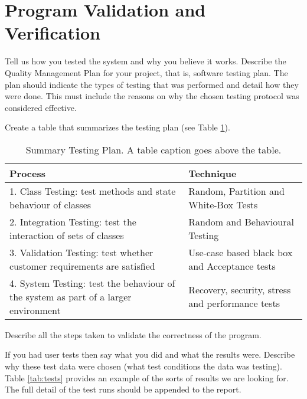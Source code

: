 \section{Program Validation and Verification}
\label{ss:progr-valid-verif}

Tell us how you tested the system and why you believe it works.
Describe the Quality Management Plan for your project, that is,
software testing plan. The plan should indicate the types of testing
that was performed and detail how they were done. This must include
the reasons on why the chosen testing protocol was considered
effective.

Create a table that summarizes the testing plan (see Table
\ref{tab:test-plan}).

\begin{table}[h!]
  \centering
\caption{Summary Testing Plan. A table caption goes above the table.}
\begin{tabular}[t]{|p{8cm}|p{7cm}|} \hline
  \textbf{Process} & \textbf{Technique} \\ \hline 1. Class
    Testing: test methods and state behaviour of classes & Random,
    Partition and White-Box Tests \\ \hline 2. Integration Testing:
    test the
    interaction of sets of classes & Random and Behavioural Testing \\
    \hline 3. Validation Testing: test whether customer requirements
    are satisfied & Use-case based black box and Acceptance tests \\
    \hline 4. System Testing: test the behaviour of the system as part
    of a larger environment & Recovery, security, stress and
    performance tests \\ \hline

\end{tabular}

\label{tab:test-plan}
\end{table}
Describe all the steps taken to validate the correctness of the
program.

If you had user tests then say what you did and what the results
were. Describe why these test data were chosen (what test conditions
the data was testing).  Table \ref{tab:tests} provides an example of
the sorts of results we are looking for. The full detail of the test
runs should be appended to the report.

